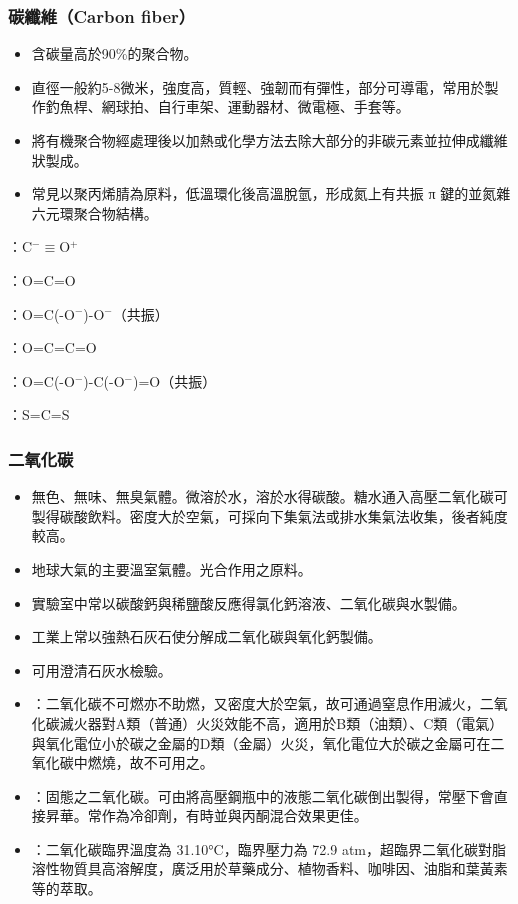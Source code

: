 \documentclass[a4paper,12pt]{report}
\begin{document}
\subsubsection{碳纖維（Carbon fiber）}
\begin{itemize}
\item 含碳量高於90\%的聚合物。
\item 直徑一般約5-8微米，強度高，質輕、強韌而有彈性，部分可導電，常用於製作釣魚桿、網球拍、自行車架、運動器材、微電極、手套等。
\item 將有機聚合物經處理後以加熱或化學方法去除大部分的非碳元素並拉伸成纖維狀製成。
\item 常見以聚丙烯腈為原料，低溫環化後高溫脫氫，形成氮上有共振 π 鍵的並氮雜六元環聚合物結構。
\end{itemize}
\bit
\item {}：C$^-\equiv$O$^+$
\item {}：O=C=O
\item {}：O=C(-O$^-$)-O$^-$（共振）
\item {}：O=C=C=O
\item {}：O=C(-O$^-$)-C(-O$^-$)=O（共振）
\item {}：S=C=S
\eit
\subsubsection{二氧化碳}
\begin{itemize}
\item 無色、無味、無臭氣體。微溶於水，溶於水得碳酸。糖水通入高壓二氧化碳可製得碳酸飲料。密度大於空氣，可採向下集氣法或排水集氣法收集，後者純度較高。
\item 地球大氣的主要溫室氣體。光合作用之原料。
\item 實驗室中常以碳酸鈣與稀鹽酸反應得氯化鈣溶液、二氧化碳與水製備。
\item 工業上常以強熱石灰石使分解成二氧化碳與氧化鈣製備。
\item 可用澄清石灰水檢驗。
\item {}：二氧化碳不可燃亦不助燃，又密度大於空氣，故可通過窒息作用滅火，二氧化碳滅火器對A類（普通）火災效能不高，適用於B類（油類）、C類（電氣）與氧化電位小於碳之金屬的D類（金屬）火災，氧化電位大於碳之金屬可在二氧化碳中燃燒，故不可用之。
\item {}：固態之二氧化碳。可由將高壓鋼瓶中的液態二氧化碳倒出製得，常壓下會直接昇華。常作為冷卻劑，有時並與丙酮混合效果更佳。
\item {}：二氧化碳臨界溫度為 31.10°C，臨界壓力為 72.9 atm，超臨界二氧化碳對脂溶性物質具高溶解度，廣泛用於草藥成分、植物香料、咖啡因、油脂和葉黃素等的萃取。
\end{itemize}
\end{document}
